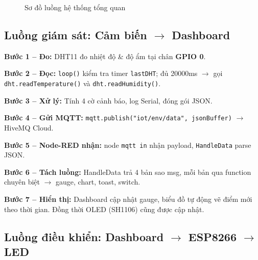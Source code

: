 \documentclass[13pt,a4paper]{article}
\newcommand{\code}[1]{\texttt{#1}}
\begin{document}
\begin{figure}[htbp]
    \caption{Sơ đồ luồng hệ thống tổng quan}
    \label{fig:systemflow}
\end{figure}

\subsection{Luồng giám sát: Cảm biến $\rightarrow$ Dashboard}
\label{sec:luong1}

\textbf{Bước 1 -- Đo:} DHT11 đo nhiệt độ \& độ ẩm tại chân \textbf{GPIO 0}.

\textbf{Bước 2 -- Đọc:} \code{loop()} kiểm tra timer \code{lastDHT}; đủ 20000ms $\rightarrow$ gọi \code{dht.readTemperature()} và \code{dht.readHumidity()}.

\textbf{Bước 3 -- Xử lý:} Tính 4 cờ cảnh báo, log Serial, đóng gói JSON.

\textbf{Bước 4 -- Gửi MQTT:} \code{mqtt.publish("iot/env/data", jsonBuffer)} $\rightarrow$ HiveMQ Cloud.

\textbf{Bước 5 -- Node-RED nhận:} node \code{mqtt in} nhận payload, \code{HandleData} parse JSON.

\textbf{Bước 6 -- Tách luồng:} HandleData trả 4 bản sao msg, mỗi bản qua function chuyên biệt $\rightarrow$ gauge, chart, toast, switch.

\textbf{Bước 7 -- Hiển thị:} Dashboard cập nhật gauge, biểu đồ tự động vẽ điểm mới theo thời gian. Đồng thời OLED (SH1106) cũng được cập nhật.

\subsection{Luồng điều khiển: Dashboard $\rightarrow$ ESP8266 $\rightarrow$ LED}
\label{sec:luong2}
\end{document}
